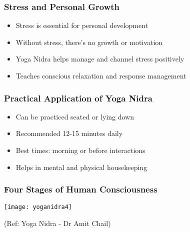 \begin{frame}[fragile]\frametitle{Stress and Personal Growth}
    \begin{itemize}
        \item Stress is essential for personal development
        \item Without stress, there's no growth or motivation
        \item Yoga Nidra helps manage and channel stress positively
        \item Teaches conscious relaxation and response management
    \end{itemize}
\end{frame}

\begin{frame}[fragile]\frametitle{Practical Application of Yoga Nidra}
    \begin{itemize}
        \item Can be practiced seated or lying down
        \item Recommended 12-15 minutes daily
        \item Best times: morning or before interactions
        \item Helps in mental and physical housekeeping
    \end{itemize}
\end{frame}


\begin{frame}[fragile]\frametitle{Four Stages of Human Consciousness}
      \begin{center}
        \texttt{[image: yoganidra4]}

		{\tiny (Ref: Yoga Nidra - Dr Amit Chail)}		
        \end{center}

\end{frame}

